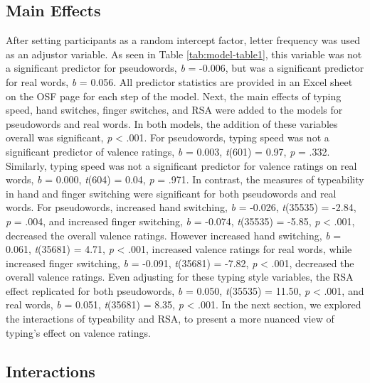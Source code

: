 \documentclass[english,man, mask]{apa6}
\theoremstyle{definition}
\theoremstyle{definition}
\theoremstyle{definition}
\theoremstyle{remark}
\begin{document}
\subsection{Main Effects}\label{main-effects}

After setting participants as a random intercept factor, letter
frequency was used as an adjustor variable. As seen in Table
\ref{tab:model-table1}, this variable was not a significant predictor
for pseudowords, \emph{b} = -0.006, but was a significant predictor for
real words, \emph{b} = 0.056. All predictor statistics are provided in
an Excel sheet on the OSF page for each step of the model. Next, the
main effects of typing speed, hand switches, finger switches, and RSA
were added to the models for pseudowords and real words. In both models,
the addition of these variables overall was significant, \emph{p}
\textless{} .001. For pseudowords, typing speed was not a significant
predictor of valence ratings, \emph{b} = 0.003, \emph{t}(601) = 0.97,
\emph{p} = .332. Similarly, typing speed was not a significant predictor
for valence ratings on real words, \emph{b} = 0.000, \emph{t}(604) =
0.04, \emph{p} = .971. In contrast, the measures of typeability in hand
and finger switching were significant for both pseudowords and real
words. For pseudowords, increased hand switching, \emph{b} = -0.026,
\emph{t}(35535) = -2.84, \emph{p} = .004, and increased finger
switching, \emph{b} = -0.074, \emph{t}(35535) = -5.85, \emph{p}
\textless{} .001, decreased the overall valence ratings. However
increased hand switching, \emph{b} = 0.061, \emph{t}(35681) = 4.71,
\emph{p} \textless{} .001, increased valence ratings for real words,
while increased finger switching, \emph{b} = -0.091, \emph{t}(35681) =
-7.82, \emph{p} \textless{} .001, decreased the overall valence ratings.
Even adjusting for these typing style variables, the RSA effect
replicated for both pseudowords, \emph{b} = 0.050, \emph{t}(35535) =
11.50, \emph{p} \textless{} .001, and real words, \emph{b} = 0.051,
\emph{t}(35681) = 8.35, \emph{p} \textless{} .001. In the next section,
we explored the interactions of typeability and RSA, to present a more
nuanced view of typing's effect on valence ratings.

\subsection{Interactions}\label{interactions}
\end{document}
